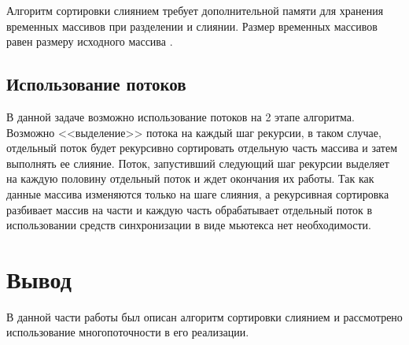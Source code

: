 Алгоритм сортировки слиянием требует дополнительной памяти для хранения временных массивов при разделении и слиянии. Размер временных массивов равен размеру исходного массива \cite{merge}.


\subsection{Использование потоков}
В данной задаче возможно использование потоков на 2 этапе алгоритма. Возможно <<выделение>> потока на каждый шаг рекурсии, в таком случае, 
отдельный поток будет рекурсивно сортировать отдельную часть массива  и затем выполнять ее слияние. Поток, запустивший следующий шаг рекурсии 
выделяет на каждую половину отдельный поток и ждет окончания их работы. Так как данные массива изменяются только на шаге слияния, а рекурсивная сортировка
разбивает массив на части и каждую часть обрабатывает отдельный поток в использовании средств синхронизации в виде мьютекса нет необходимости.

\section*{Вывод}
В данной части работы был описан алгоритм сортировки слиянием и рассмотрено использование многопоточности в его реализации.






